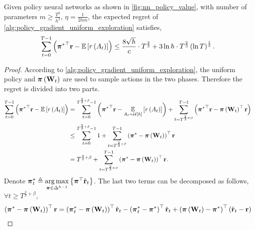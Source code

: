 \begin{thm}
\label{thm:policy_gradient_main_result}
    Given policy neural networks as shown in \cref{fig:nn_policy_value}, with number of parameters $m \ge \frac{T^2}{h^2}$, $\eta = \frac{1}{2 h m}$, the expected regret of \cref{alg:policy_gradient_uniform_exploration} satisfies,
\begin{equation*}
\begin{split}
    \sum\limits_{t=0}^{T-1}{ \left( {{\boldsymbol{\pi}}^*}^\top {\mathbf{r}} - {\mathbb{E}} \left[ r\left(A_t\right) \right] \right)} \le \frac{8 \sqrt{h}}{c} \cdot T^{\frac{2}{3}} + 3 \ln{h} \cdot T^{\frac{2}{3}} \left(\ln{T}\right)^{\frac{1}{3}}.
\end{split}
\end{equation*}
\end{thm}
\begin{proof}
According to \cref{alg:policy_gradient_uniform_exploration}, the uniform policy and ${\boldsymbol{\pi}}\left( {\mathbf{W}}_t \right)$ are used to sample actions in the two phases. Therefore the regret is divided into two parts.
\begin{equation}
\label{eq:total_regret_decomposition}
\begin{split}
    \sum\limits_{t=0}^{T-1}{ \left( {{\boldsymbol{\pi}}^*}^\top {\mathbf{r}} - {\mathbb{E}} \left[ r\left(A_t\right) \right] \right) } &= \sum\limits_{t=0}^{T^{\frac{2}{3} + \beta} - 1}{ \left( {{\boldsymbol{\pi}}^*}^\top {\mathbf{r}} - \operatorname*{{\mathbb{E}}}\limits_{A_t \sim {\mathcal{U}}\left[h\right]}{ \left[ r\left(A_t\right) \right] } \right) } + \sum\limits_{t=T^{\frac{2}{3} + \beta}}^{T-1}{ \left( {{\boldsymbol{\pi}}^*}^\top {\mathbf{r}} - {\boldsymbol{\pi}}\left( {\mathbf{W}}_t \right)^\top {\mathbf{r}} \right) } \\
    &\le \sum\limits_{t=0}^{T^{\frac{2}{3} + \beta} - 1}{1} + \sum\limits_{t=T^{\frac{2}{3} + \beta}}^{T-1}{ \left( {{\boldsymbol{\pi}}^*} - {\boldsymbol{\pi}}\left( {\mathbf{W}}_t \right) \right)^\top {\mathbf{r}} } \\
    &= T^{\frac{2}{3} + \beta} + \sum\limits_{t=T^{\frac{2}{3} + \beta}}^{T-1}{ \left( {{\boldsymbol{\pi}}^*} - {\boldsymbol{\pi}}\left( {\mathbf{W}}_t \right) \right)^\top {\mathbf{r}} }.
\end{split}
\end{equation}
Denote ${\boldsymbol{\pi}}_t^* \triangleq \operatorname*{arg\,max}\limits_{{\boldsymbol{\pi}} \in \Delta^{h-1}}{\left\{ {\boldsymbol{\pi}}^\top \hat{{\mathbf{r}}}_t\right\}}$. The last two terms can be decomposed as follows, $\forall t \ge T^{\frac{2}{3} + \beta}$,
\begin{equation}
\label{eq:playing_learning_phase_regret_decomposition}
\begin{split}
    \left( {\rvpi^*} - \rvpi\left( \rmW_t \right) \right)^\top \rvr &= \left( {\rvpi_t^*} - \rvpi\left( \rmW_t \right) \right)^\top \hat{\rvr}_t - \left( {\rvpi_t^*} - {\rvpi^*} \right)^\top \hat{\rvr}_t + \left( \rvpi\left( \rmW_t \right) - {\rvpi^*}\right)^\top \left( \hat{\rvr}_t - \rvr \right) \\

\end{split}
\end{equation}
\end{proof}
